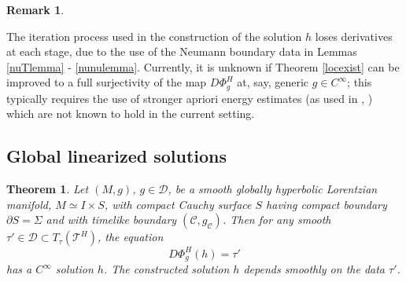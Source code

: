 \documentclass[10pt]{amsart}
\newcommand{\Si}{\Sigma}
\newcommand{\cC}{{\mathcal C}}
\newcommand{\cT}{{\mathcal T}}
\newcommand{\cD}{{\mathcal D}}
\newcommand{\be}{\begin{equation}}
\newcommand{\ee}{\end{equation}}
\newcommand{\p}{\partial}
\newcommand{\<}{\langle}
\renewcommand{\>}{\rangle}
\theoremstyle{plain}
\newtheorem{theorem}[lemma]{Theorem}
\theoremstyle{remark}
\theoremstyle{definition}
\newtheorem{remark}[lemma]{Remark}
\numberwithin{equation}{section}
\begin{document}
\begin{remark}\label{derivloss}

  The iteration process used in the construction of the solution $h$ loses derivatives at each stage, due to the use of the Neumann boundary data in 
Lemmas \ref{nuTlemma} - \ref{nunulemma}. Currently, it is unknown if Theorem \ref{locexist} can be improved to a full surjectivity of the map $D\Phi_g^H$ 
at, say,  generic $g \in C^{\infty}$; this typically requires the use of stronger apriori energy estimates (as used in \cite{I}, \cite{II}) which are not known to hold in the 
current setting.   
  
 \end{remark}

\subsection{Global linearized solutions} 

\begin{theorem}\label{globexist}
Let $(M, g)$, $g \in \cD$, be a smooth globally hyperbolic Lorentzian manifold, $M \simeq I \times S$, with compact Cauchy surface $S$ having compact 
boundary $\p S = \Si$ and with timelike boundary $(\cC, g_{\cC})$. Then for any smooth $\tau' \in \cD \subset T_{\tau}(\cT^H)$, the equation 
\be \label{wL3}
D\Phi_g^H(h) = \tau'
\ee
has a $C^{\infty}$ solution $h$. The constructed solution $h$ depends smoothly on the data $\tau'$. 
\end{theorem} 
 
\end{document}
